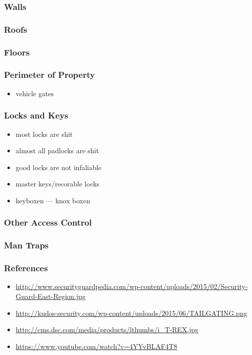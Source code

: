 \documentclass[]{beamer}
\begin{document}
\begin{frame}
  \frametitle{Walls}
\end{frame}

\begin{frame}
  \frametitle{Roofs}
\end{frame}

\begin{frame}
  \frametitle{Floors}
\end{frame}

\begin{frame}
  \frametitle{Perimeter of Property}
  \begin{itemize}
    \item vehicle gates
  \end{itemize}
\end{frame}

\begin{frame}
  \frametitle{Locks and Keys}
  \begin{itemize}
    \item most locks are shit
    \item almost all padlocks are shit
    \item good locks are not infaliable
    \item master keys/recorable locks
    \item keyboxen --- knox boxen
  \end{itemize}
\end{frame}

\begin{frame}
  \frametitle{Other Access Control}
\end{frame}

\begin{frame}
  \frametitle{Man Traps}
\end{frame}

\begin{frame}
  \frametitle{References}
  \begin{itemize}
    \item \url{http://www.securityguardpedia.com/wp-content/uploads/2015/02/Security-Guard-East-Region.jpg}
    \item \url{http://kudos-security.com/wp-content/uploads/2015/06/TAILGATING.png}
    \item \url{http://cms.dsc.com/media/products/lthumbs/i_T-REX.jpg}
    \item \url{https://www.youtube.com/watch?v=4YYvBLAF4T8}
  \end{itemize}

\end{frame}
\end{document}
